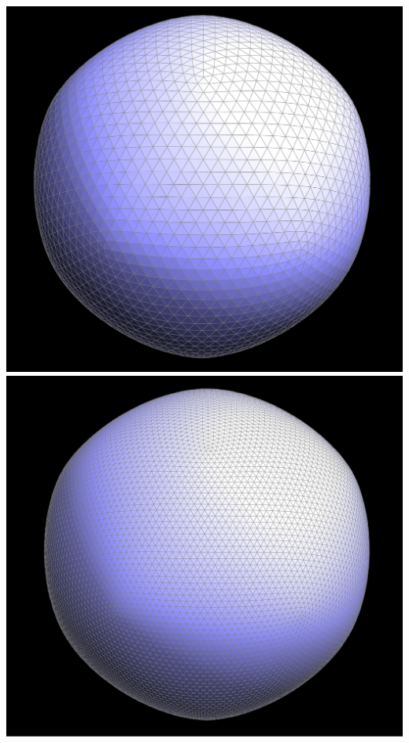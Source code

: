 \documentclass{article}
\begin{document}
\begin{center}
    \includegraphics[]{task 6/iso5.png}
    \includegraphics[]{task 6/iso6.png}

\end{center}
\end{document}
